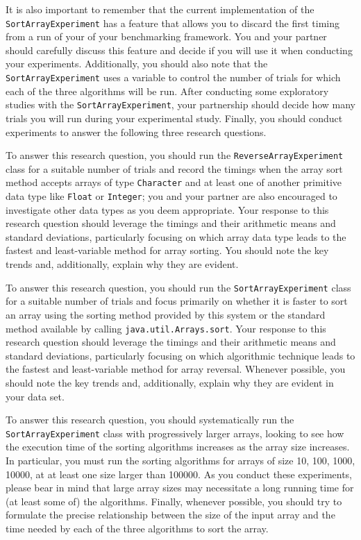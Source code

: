 It is also important to remember that the current implementation of the {\tt SortArrayExperiment} has a feature that
allows you to discard the first timing from a run of your of your benchmarking framework. You and your partner should
carefully discuss this feature and decide if you will use it when conducting your experiments. Additionally, you should
also note that the {\tt SortArrayExperiment} uses a variable to control the number of trials for which each of the three
algorithms will be run. After conducting some exploratory studies with the {\tt SortArrayExperiment}, your partnership
should decide how many trials you will run during your experimental study. Finally, you should conduct experiments to
answer the following three research questions.

 To
answer this research question, you should run the {\tt ReverseArrayExperiment} class for a suitable number of trials and
record the timings when the array sort method accepts arrays of type {\tt Character} and at least one of another
primitive data type like {\tt Float} or {\tt Integer}; you and your partner are also encouraged to investigate other
data types as you deem appropriate. Your response to this research question should leverage the timings and their
arithmetic means and standard deviations, particularly focusing on which array data type leads to the fastest and
least-variable method for array sorting. You should note the key trends and, additionally, explain why they are evident.

 To answer this research question, you should run the {\tt SortArrayExperiment} class for a suitable number
of trials and focus primarily on whether it is faster to sort an array using the sorting method provided by this system
or the standard method available by calling {\tt java.util.Arrays.sort}. Your response to this research question should
leverage the timings and their arithmetic means and standard deviations, particularly focusing on which algorithmic
technique leads to the fastest and least-variable method for array reversal. Whenever possible, you should note the key
trends and, additionally, explain why they are evident in your data set.

 To answer this
research question, you should systematically run the {\tt SortArrayExperiment} class with progressively larger arrays,
looking to see how the execution time of the sorting algorithms increases as the array size increases. In particular,
you must run the sorting algorithms for arrays of size 10, 100, 1000, 10000, at at least one size larger than 100000. As
you conduct these experiments, please bear in mind that large array sizes may necessitate a long running time for (at
least some of) the algorithms. Finally, whenever possible, you should try to formulate the precise relationship between the size
of the input array and the time needed by each of the three algorithms to sort the array.

